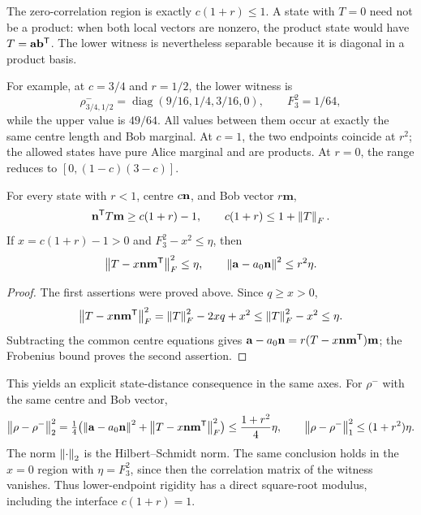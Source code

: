 The zero-correlation region is exactly $c(1+r)\leq1$.
A state with $T=0$ need not be a product: when both local vectors are
nonzero, the product state would have $T=\mathbf a\mathbf b^{\mathsf T}$.
The lower witness is nevertheless separable because it is diagonal in a
product basis.

For example, at $c=3/4$ and $r=1/2$, the lower witness is
\[
\rho^-_{3/4,1/2}=\operatorname{diag}(9/16,1/4,3/16,0),
\qquad F_3^2=1/64,
\]
while the upper value is $49/64$. All values between them occur at exactly
the same centre length and Bob marginal. At $c=1$, the two endpoints
coincide at $r^2$; the allowed states have pure Alice marginal and are
products. At $r=0$, the range reduces to $[0,(1-c)(3-c)]$.

\begin{corollary}
For every state with $r<1$, centre $c\mathbf n$, and Bob vector $r\mathbf m$,
\[
\mathbf n^{\mathsf T}T\mathbf m\geq c(1+r)-1,
\qquad c(1+r)\leq1+\left\lVert T\right\rVert_F.
\]
If $x=c(1+r)-1>0$ and $F_3^2-x^2\leq\eta$, then
\begin{equation}\label{eq:lowerstability}
\left\lVert T-x\mathbf n\mathbf m^{\mathsf T}\right\rVert_F^2\leq\eta,
\qquad
\left\lVert\mathbf a-a_0\mathbf n\right\rVert^2\leq r^2\eta.
\end{equation}
\end{corollary}
\begin{proof}
The first assertions were proved above. Since $q\geq x>0$,
\[
\left\lVert T-x\mathbf n\mathbf m^{\mathsf T}\right\rVert_F^2
=\left\lVert T\right\rVert_F^2-2xq+x^2\leq\left\lVert T\right\rVert_F^2-x^2\leq\eta.
\]
Subtracting the common centre equations gives
$\mathbf a-a_0\mathbf n=r(T-x\mathbf n\mathbf m^{\mathsf T})\mathbf m$;
the Frobenius bound proves the second assertion.
\end{proof}

This yields an explicit state-distance consequence in the same axes. For
$\rho^-$ with the same centre and Bob vector,
\[
\left\lVert\rho-\rho^-\right\rVert_2^2
=\tfrac14\bigl(\left\lVert\mathbf a-a_0\mathbf n\right\rVert^2+
\left\lVert T-x\mathbf n\mathbf m^{\mathsf T}\right\rVert_F^2\bigr)
\leq\frac{1+r^2}{4}\eta,
\qquad
\left\lVert\rho-\rho^-\right\rVert_1^2\leq(1+r^2)\eta.
\]
The norm $\left\lVert\cdot\right\rVert_2$ is the Hilbert--Schmidt norm. The same conclusion
holds in the $x=0$ region with $\eta=F_3^2$, since then the correlation
matrix of the witness vanishes. Thus lower-endpoint rigidity has a direct
square-root modulus, including the interface $c(1+r)=1$.
